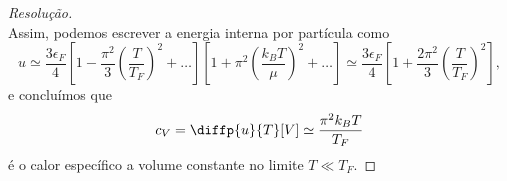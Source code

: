 \begin{proof}[Resolução]
\begin{equation*}
    \end{equation*}
    Assim, podemos escrever a energia interna por partícula como
    \begin{equation*}
        u \simeq \frac{3 \epsilon_F}{4} \left[1 - \frac{\pi^2}{3}\left(\frac{T}{T_F}\right)^2 + \dots\right]\left[1 + \pi^2 \left(\frac{k_B T}{\mu}\right)^2 + \dots\right] \simeq \frac{3 \epsilon_F}{4}\left[1 + \frac{2\pi^2}{3}\left(\frac{T}{T_F}\right)^2\right],
    \end{equation*}
    e concluímos que
    \begin{equation*}
        c_V = \diffp{u}{T}[V] \simeq \frac{\pi^2 k_B T}{T_F}
    \end{equation*}
    é o calor específico a volume constante no limite \(T \ll T_F\).
\end{proof}
